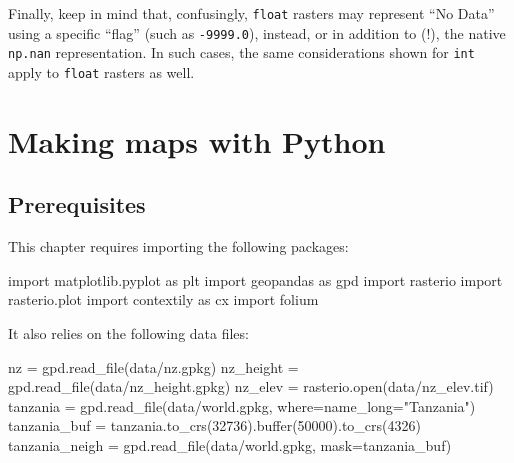 \documentclass[
  letterpaper,
]{krantz}
\newenvironment{Shaded}{\begin{snugshade}}{\end{snugshade}}
\newcommand{\BuiltInTok}[1]{\textcolor[rgb]{0.00,0.23,0.31}{#1}}
\newcommand{\DecValTok}[1]{\textcolor[rgb]{0.68,0.00,0.00}{#1}}
\newcommand{\ImportTok}[1]{\textcolor[rgb]{0.00,0.46,0.62}{#1}}
\newcommand{\NormalTok}[1]{\textcolor[rgb]{0.00,0.23,0.31}{#1}}
\newcommand{\OperatorTok}[1]{\textcolor[rgb]{0.37,0.37,0.37}{#1}}
\newcommand{\StringTok}[1]{\textcolor[rgb]{0.13,0.47,0.30}{#1}}
\begin{document}
Finally, keep in mind that, confusingly, \texttt{float} rasters may
represent ``No Data'' using a specific ``flag'' (such as
\texttt{-9999.0}), instead, or in addition to (!), the native
\texttt{np.nan} representation. In such cases, the same considerations
shown for \texttt{int} apply to \texttt{float} rasters as well.


\chapter{Making maps with Python}\label{sec-map-making}

\section*{Prerequisites}\label{prerequisites-7}


This chapter requires importing the following packages:

\begin{Shaded}
\begin{Highlighting}[]
\ImportTok{import}\NormalTok{ matplotlib.pyplot }\ImportTok{as}\NormalTok{ plt}
\ImportTok{import}\NormalTok{ geopandas }\ImportTok{as}\NormalTok{ gpd}
\ImportTok{import}\NormalTok{ rasterio}
\ImportTok{import}\NormalTok{ rasterio.plot}
\ImportTok{import}\NormalTok{ contextily }\ImportTok{as}\NormalTok{ cx}
\ImportTok{import}\NormalTok{ folium}
\end{Highlighting}
\end{Shaded}

It also relies on the following data files:

\begin{Shaded}
\begin{Highlighting}[]
\NormalTok{nz }\OperatorTok{=}\NormalTok{ gpd.read\_file(}\StringTok{\textquotesingle{}data/nz.gpkg\textquotesingle{}}\NormalTok{)}
\NormalTok{nz\_height }\OperatorTok{=}\NormalTok{ gpd.read\_file(}\StringTok{\textquotesingle{}data/nz\_height.gpkg\textquotesingle{}}\NormalTok{)}
\NormalTok{nz\_elev }\OperatorTok{=}\NormalTok{ rasterio.}\BuiltInTok{open}\NormalTok{(}\StringTok{\textquotesingle{}data/nz\_elev.tif\textquotesingle{}}\NormalTok{)}
\NormalTok{tanzania }\OperatorTok{=}\NormalTok{ gpd.read\_file(}\StringTok{\textquotesingle{}data/world.gpkg\textquotesingle{}}\NormalTok{, where}\OperatorTok{=}\StringTok{\textquotesingle{}name\_long="Tanzania"\textquotesingle{}}\NormalTok{)}
\NormalTok{tanzania\_buf }\OperatorTok{=}\NormalTok{ tanzania.to\_crs(}\DecValTok{32736}\NormalTok{).}\BuiltInTok{buffer}\NormalTok{(}\DecValTok{50000}\NormalTok{).to\_crs(}\DecValTok{4326}\NormalTok{)}
\NormalTok{tanzania\_neigh }\OperatorTok{=}\NormalTok{ gpd.read\_file(}\StringTok{\textquotesingle{}data/world.gpkg\textquotesingle{}}\NormalTok{, mask}\OperatorTok{=}\NormalTok{tanzania\_buf)}
\end{Highlighting}
\end{Shaded}
\end{document}
